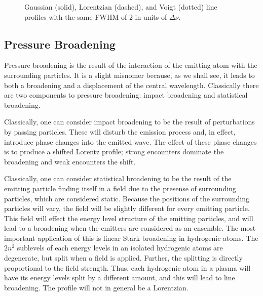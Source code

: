 \begin{figure}
\footnotesize
{}
\caption{Gaussian (solid), Lorentzian (dashed), and Voigt (dotted) line profiles with the same FWHM of 2 in units of $\Delta\nu$.}
\label{figure:profile-comparison}
\end{figure}

\newslide

\subsection{Pressure Broadening}

Pressure broadening is the result of the interaction of the
emitting atom with the surrounding particles. It is a slight
misnomer because, as we shall see, it leads to both a
broadening and a displacement of the central wavelength.
Classically there are two components to pressure broadening:
impact broadening and statistical broadening.

Classically, one can consider impact broadening to be the
result of perturbations by passing particles. These will
disturb the emission process and, in effect, introduce phase
changes into the emitted wave. The effect of these phase
changes is to produce a shifted Lorentz profile; strong
encounters dominate the broadening and weak encounters the
shift.

Classically, one can consider statistical broadening to be
the result of the emitting particle finding itself in a
field due to the presense of surrounding particles, which
are considered static. Because the positions of the
surrounding particles will vary, the field will be slightly
different for every emitting particle. This field will
effect the energy level structure of the emitting particles,
and will lead to a broadening when the emitters are
considered as an ensemble. The most important application of
this is linear Stark broadening in hydrogenic atoms. The
$2n^2$ sublevels of each energy levels in an isolated
hydrogenic atoms are degenerate, but split when a field is
applied. Further, the splitting is directly proportional to
the field strength. Thus, each hydrogenic atom in a plasma
will have its energy levels split by a different amount, and
this will lead to line broadening. The profile will not in
general be a Lorentzian.

